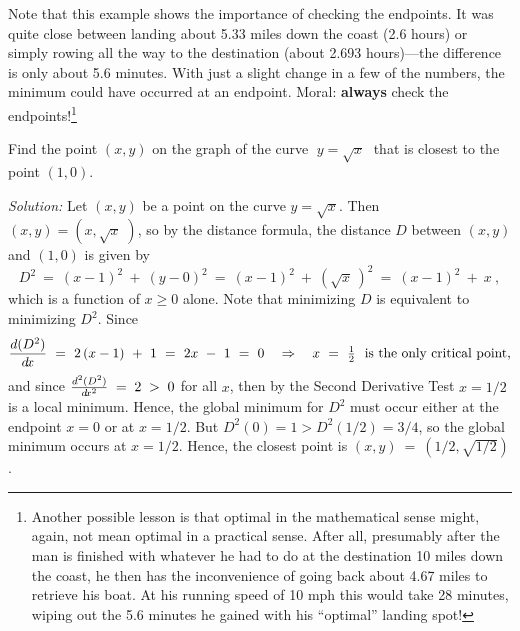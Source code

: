 \begin{exmp}
\noindent Note that this example shows the importance of checking the endpoints.
It was quite close between landing about 5.33 miles down the coast (2.6 hours)
or simply rowing all the way to the destination (about 2.693 hours)---the
difference is only about 5.6 minutes. With just a slight change in a few of the
numbers, the minimum could have occurred at an endpoint. Moral:
\textbf{always} check the endpoints!\footnote{Another possible lesson is that
optimal in the mathematical sense might, again, not mean optimal in a practical
sense. After all, presumably after the man is finished with whatever he had to
do at the destination 10 miles down the coast, he then has the inconvenience of
going back about 4.67 miles to retrieve his boat. At his running speed of 10 mph
this would take 28 minutes, wiping out the 5.6 minutes he gained with his
``optimal'' landing spot!}
\end{exmp}
\begin{exmp}\label{exmp:minmax6}
\noindent Find the point $(x,y)$ on the graph of the curve $\;y=\sqrt{x}\;$ that
is closest to the point $(1,0)$.
 \par\noindent\emph{Solution:} Let $(x,y)$ be a point on the curve $y=\sqrt{x}$.
 Then $(x,y) = (x,\sqrt{x}\;)$, so by the distance formula, the distance $D$
 between $(x,y)$ and $(1,0)$ is given by
 \begin{displaymath}
  D^2 ~=~ (x-1)^2 ~+~ (y - 0)^2 ~=~ (x-1)^2 ~+~ (\sqrt{x}\,)^2 ~=~ (x-1)^2 ~+~ x~,
 \end{displaymath}
 which is a function of $x \ge 0$ alone. Note that minimizing $D$ is equivalent to
 minimizing $D^2$. Since
 \begin{displaymath}
  \dfrac{d(D^2)}{d\!x} ~=~ 2\,(x-1) ~+~ 1 ~=~ 2x ~-~ 1
   ~=~ 0 \quad\Rightarrow\quad x ~=~ \tfrac{1}{2} ~~\text{is the only critical point,}
 \end{displaymath}
 and since $\frac{d^2(D^2)}{d\!x^2} \;=\; 2 \;>\; 0$ for all $x$, then by the
 Second Derivative Test $x=1/2$ is a local minimum. Hence, the global minimum
 for $D^2$ must occur either at the endpoint $x=0$ or at $x=1/2$. But $D^2(0)=1 >
 D^2(1/2)=3/4$, so the global minimum occurs at $x=1/2$. Hence, the closest
 point is $(x,y) ~=~ (1/2,\sqrt{1/2})$.
\end{exmp}

